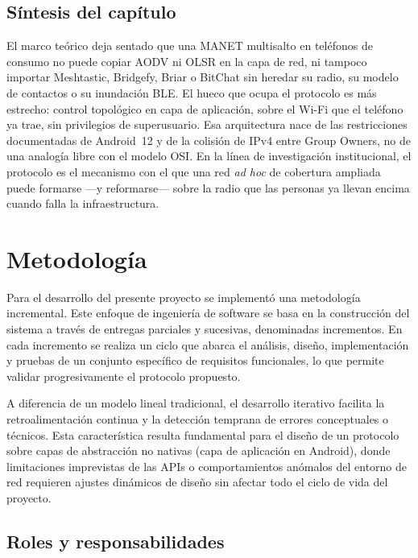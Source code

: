 \documentclass[12pt,oneside]{scrreprt}
\begin{document}
\section{Síntesis del capítulo}
\label{sec:sintesis-marco-teorico}

El marco teórico deja sentado que una MANET multisalto en teléfonos de consumo no puede copiar AODV ni OLSR en la capa de red, ni tampoco importar Meshtastic, Bridgefy, Briar o BitChat sin heredar su radio, su modelo de contactos o su inundación BLE. El hueco que ocupa el protocolo es más estrecho: control topológico en capa de aplicación, sobre el Wi-Fi que el teléfono ya trae, sin privilegios de superusuario. Esa arquitectura nace de las restricciones documentadas de Android~12 y de la colisión de IPv4 entre Group Owners, no de una analogía libre con el modelo OSI. En la línea de investigación institucional, el protocolo es el mecanismo con el que una red \emph{ad hoc} de cobertura ampliada puede formarse ---y reformarse--- sobre la radio que las personas ya llevan encima cuando falla la infraestructura.

\chapter{Metodología}
\label{ch:metodo}
Para el desarrollo del presente proyecto se implementó una metodología incremental. Este enfoque de ingeniería de software se basa en la construcción del sistema a través de entregas parciales y sucesivas, denominadas incrementos. En cada incremento se realiza un ciclo que abarca el análisis, diseño, implementación y pruebas de un conjunto específico de requisitos funcionales, lo que permite validar progresivamente el protocolo propuesto.

A diferencia de un modelo lineal tradicional, el desarrollo iterativo facilita la retroalimentación continua y la detección temprana de errores conceptuales o técnicos. Esta característica resulta fundamental para el diseño de un protocolo sobre capas de abstracción no nativas (capa de aplicación en Android), donde limitaciones imprevistas de las APIs o comportamientos anómalos del entorno de red requieren ajustes dinámicos de diseño sin afectar todo el ciclo de vida del proyecto.

\section{Roles y responsabilidades}
\end{document}
